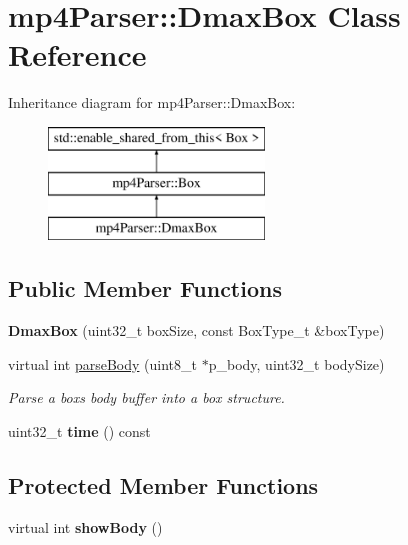\hypertarget{classmp4_parser_1_1_dmax_box}{}\section{mp4\+Parser\+::Dmax\+Box Class Reference}
\label{classmp4_parser_1_1_dmax_box}
Inheritance diagram for mp4\+Parser\+::Dmax\+Box\+:\begin{figure}[H]
\begin{center}
\leavevmode
\includegraphics[height=3.000000cm]{classmp4_parser_1_1_dmax_box}
\end{center}
\end{figure}
\subsection*{Public Member Functions}
\begin{DoxyCompactItemize}
\item 
\mbox{\label{classmp4_parser_1_1_dmax_box_abcea2b31cccf0f14b6cb93a8e5d0a07d}} 
{\bfseries Dmax\+Box} (uint32\+\_\+t box\+Size, const Box\+Type\+\_\+t \&box\+Type)
\item 
virtual int \mbox{\hyperlink{classmp4_parser_1_1_dmax_box_ab786df72363e5b819e553168e3922ab1}{parse\+Body}} (uint8\+\_\+t $\ast$p\+\_\+body, uint32\+\_\+t body\+Size)
\begin{DoxyCompactList}\small\item\em Parse a box\textquotesingle{}s body buffer into a box structure. \end{DoxyCompactList}\item 
\mbox{\label{classmp4_parser_1_1_dmax_box_a5c8130e636ffee6759bdf9435a59824f}} 
uint32\+\_\+t {\bfseries time} () const
\end{DoxyCompactItemize}
\subsection*{Protected Member Functions}
\begin{DoxyCompactItemize}
\item 
\mbox{\label{classmp4_parser_1_1_dmax_box_a39e16e9f6f0a70c804be357c23d75057}} 
virtual int {\bfseries show\+Body} ()
\end{DoxyCompactItemize}
